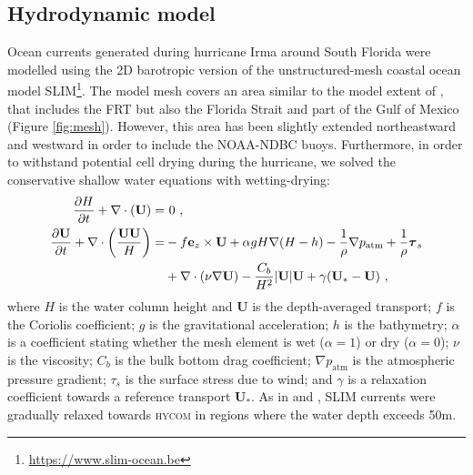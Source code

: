 \documentclass[11pt,a4paper]{article}
\newcommand{\hycom}{\textsc{hycom} }
\newcommand{\UV}{\mathbf{U}}
\begin{document}
\subsection{Hydrodynamic model}

Ocean currents generated during hurricane Irma around South Florida were modelled using the 2D barotropic version of the unstructured-mesh coastal ocean model SLIM\footnote{\url{https://www.slim-ocean.be}}. The model mesh covers an area similar to the model extent of \cite{dobbelaere2020coupled}, that includes the FRT but also the Florida Strait and part of the Gulf of Mexico (Figure \ref{fig:mesh}). However, this area has been slightly extended northeastward and westward in order to include the NOAA-NDBC buoys. Furthermore, in order to withstand potential cell drying during the hurricane, we solved the conservative shallow water equations with wetting-drying:
\begin{equation}
    \begin{split}
        \dfrac{\partial H}{\partial t} +\nabla\cdot(\UV) =& ~0~, \\
        \dfrac{\partial \UV}{\partial t}  + \nabla\cdot\left(\dfrac{\UV\UV}{H}\right) =& -f\mathbf{e}_z \times \UV + \alpha gH\nabla(H-h) - \dfrac{1}{\rho}\nabla p_\text{atm} + \dfrac{1}{\rho}\text{\boldmath$\tau$}_s \\
         &+\nabla\cdot(\nu\nabla\UV) - \dfrac{C_b}{H^2}|\UV|\UV + \gamma(\UV_\ast-\UV)~,
    \end{split} \label{eq:slim}
\end{equation}
where $H$ is the water column height and $\UV$ is the depth-averaged transport; $f$ is the Coriolis coefficient; $g$ is the gravitational acceleration; $h$ is the bathymetry; $\alpha$ is a coefficient stating whether the mesh element is wet ($\alpha=1$) or dry ($\alpha=0$); $\nu$  is the viscosity; $C_b$ is the bulk bottom drag coefficient; $\nabla p_\text{atm}$ is the atmospheric pressure gradient; {\boldmath$\tau$}$_s$ is the surface stress due to wind; and $\gamma$ is a relaxation coefficient towards a reference transport $\UV_\ast$. As in \cite{frys2020fine} and \cite{dobbelaere2020coupled}, SLIM currents were gradually relaxed towards \hycom \citep{chassignet2007hycom} in regions where the water depth exceeds 50m.
\end{document}
